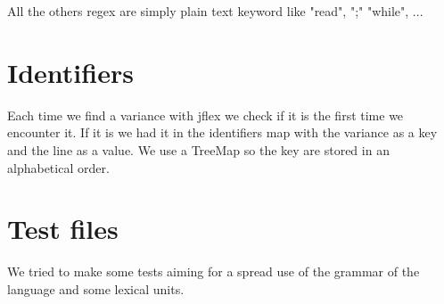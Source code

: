 \documentclass[a4paper,10pt]{report}
\begin{document}
All the others regex are simply plain text keyword like "read", ";" "while", ...

\section{Identifiers}
Each time we find a variance with jflex we check if it is the first time we encounter it. If it is we had it in the identifiers map with the variance as a key and the line as a value. We use a TreeMap so the key are stored in an alphabetical order.



\section{Test files}

We tried to make some tests aiming for a spread use of the grammar of the language and some lexical units.
\end{document}
